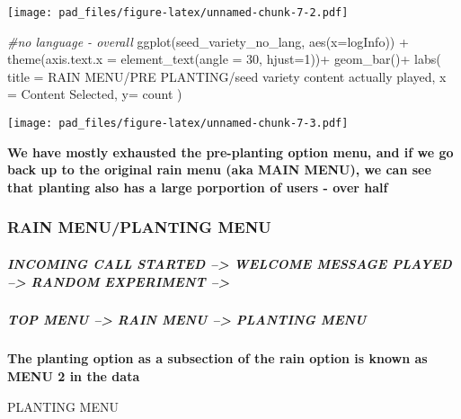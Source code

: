 \documentclass[
]{article}
\newenvironment{Shaded}{\begin{snugshade}}{\end{snugshade}}
\newcommand{\AttributeTok}[1]{\textcolor[rgb]{0.77,0.63,0.00}{#1}}
\newcommand{\CommentTok}[1]{\textcolor[rgb]{0.56,0.35,0.01}{\textit{#1}}}
\newcommand{\DecValTok}[1]{\textcolor[rgb]{0.00,0.00,0.81}{#1}}
\newcommand{\FunctionTok}[1]{\textcolor[rgb]{0.00,0.00,0.00}{#1}}
\newcommand{\NormalTok}[1]{#1}
\newcommand{\SpecialCharTok}[1]{\textcolor[rgb]{0.00,0.00,0.00}{#1}}
\newcommand{\StringTok}[1]{\textcolor[rgb]{0.31,0.60,0.02}{#1}}
\begin{document}
\texttt{[image: pad\_files/figure-latex/unnamed-chunk-7-2.pdf]}

\begin{Shaded}
\begin{Highlighting}[]
\CommentTok{\#no language {-} overall}
\FunctionTok{ggplot}\NormalTok{(seed\_variety\_no\_lang, }\FunctionTok{aes}\NormalTok{(}\AttributeTok{x=}\NormalTok{logInfo)) }\SpecialCharTok{+}
  \FunctionTok{theme}\NormalTok{(}\AttributeTok{axis.text.x =} \FunctionTok{element\_text}\NormalTok{(}\AttributeTok{angle =} \DecValTok{30}\NormalTok{, }\AttributeTok{hjust=}\DecValTok{1}\NormalTok{))}\SpecialCharTok{+}
  \FunctionTok{geom\_bar}\NormalTok{()}\SpecialCharTok{+}
  \FunctionTok{labs}\NormalTok{(}
    \AttributeTok{title =} \StringTok{\textquotesingle{}RAIN MENU/PRE PLANTING/seed variety}
\StringTok{    content actually played\textquotesingle{}}\NormalTok{,}
    \AttributeTok{x =} \StringTok{\textquotesingle{}Content Selected\textquotesingle{}}\NormalTok{,}
    \AttributeTok{y=} \StringTok{\textquotesingle{}count\textquotesingle{}}
\NormalTok{  )}
\end{Highlighting}
\end{Shaded}

\texttt{[image: pad\_files/figure-latex/unnamed-chunk-7-3.pdf]}

\textbf{We have mostly exhausted the pre-planting option menu, and if we
go back up to the original rain menu (aka MAIN MENU), we can see that
planting also has a large porportion of users - over half}

\hypertarget{rain-menuplanting-menu}{%
\subsubsection{RAIN MENU/PLANTING MENU}\label{rain-menuplanting-menu}}

\hypertarget{incoming-call-started-welcome-message-played-random-experiment-3}{%
\subparagraph{INCOMING CALL STARTED --\textgreater{} WELCOME MESSAGE
PLAYED --\textgreater{} RANDOM EXPERIMENT
--\textgreater{}}\label{incoming-call-started-welcome-message-played-random-experiment-3}}

\hypertarget{top-menu-rain-menu-planting-menu}{%
\subparagraph{TOP MENU --\textgreater{} RAIN MENU --\textgreater{}
PLANTING MENU}\label{top-menu-rain-menu-planting-menu}}

\textbf{The planting option as a subsection of the rain option is known
as MENU 2 in the data}

PLANTING MENU
\end{document}
